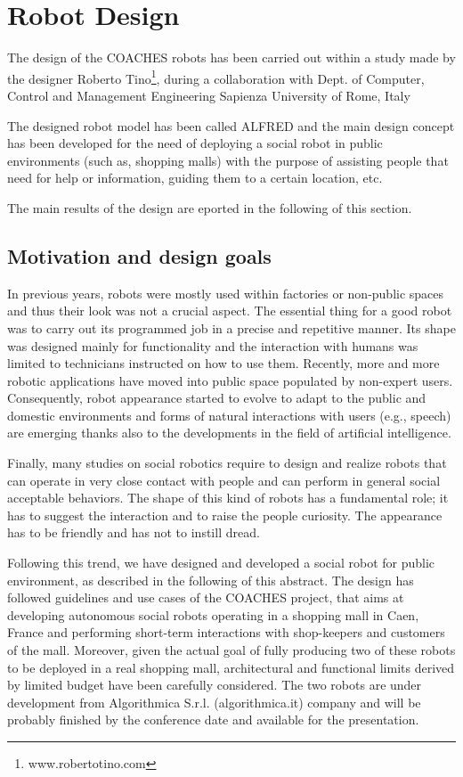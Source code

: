 \section{Robot Design}

The design of the COACHES robots has been carried out within a study made by
the designer Roberto Tino\footnote{www.robertotino.com}, during a collaboration
with Dept. of Computer, Control and Management Engineering Sapienza University of Rome, Italy


The designed robot model has been called ALFRED and the main design concept has been developed for the need of deploying a social robot in public environments (such as, shopping malls) with the purpose of assisting people that need for help or
information, guiding them to a certain location, etc.

The main results of the design are eported in the following of this section.


\subsection{Motivation and design goals}

In previous years, robots were mostly used within
factories or non-public spaces and thus their look was not
a crucial aspect. The essential thing for a good robot was
to carry out its programmed job in a precise and
repetitive manner. Its shape was designed mainly for
functionality and the interaction with humans was limited
to technicians instructed on how to use them.
Recently, more and more robotic applications have
moved into public space populated by non-expert users.
Consequently, robot appearance started to evolve to adapt
to the public and domestic environments and forms of
natural interactions with users (e.g., speech) are emerging
thanks also to the developments in the field of artificial
intelligence.

Finally, many studies on social robotics require to design and realize robots that can operate in very close
contact with people and can perform in general social acceptable behaviors. The shape of this kind of robots
has a fundamental role; it has to suggest the interaction and to raise the people curiosity. The appearance has
to be friendly and has not to instill dread.

Following this trend, we have designed and developed a social robot for public environment, as described in
the following of this abstract. The design has followed guidelines and use cases of the COACHES project,
that aims at developing autonomous social robots operating in a shopping mall in Caen, France and
performing short-term interactions with shop-keepers and customers of the mall.
Moreover, given the actual goal of fully producing two of these robots to be deployed in a real shopping
mall, architectural and functional limits derived by limited budget have been carefully considered.
The two robots are under development from Algorithmica S.r.l. (algorithmica.it) company and will be
probably finished by the conference date and available for the presentation.

